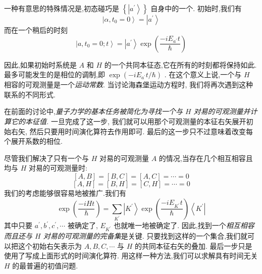 一种有意思的特殊情况是,初态碰巧是 $\left\{ \left| {a}^{\prime }\right\rangle \right\}$ 自身中的一个. 初始时,我们有
\begin{equation}
	\left| {\alpha ,{t}_{0} = 0}\right\rangle = \left| {a}^{\prime }\right\rangle
\end{equation}
而在一个稍后的时刻
\begin{equation}
	\left| {a,{t}_{0} = 0;t}\right\rangle = \left| {a}^{\prime }\right\rangle \exp \left( \frac{-i{E}_{{a}^{\prime }}t}{\hbar }\right)
\end{equation}

因此,如果初始时系统是 $A$ 和 $H$ 的一个共同本征态,它在所有的时刻都将保持如此. 最多可能发生的是相位的调制,即 $\exp \left( {-i{E}_{{a}^{\prime }}t/\hbar }\right)$ . 在这个意义上说,一个与 $H$ 相容的可观测量是一个\textit{运动常数}. 当讨论海森堡运动方程时, 我们将再次遇到这种联系的不同形式.

在前面的讨论中,\textit{量子力学的基本任务被简化为寻找一个与 $H$ 对易的可观测量并计算它的本征值.} 一旦完成了这一步, 我们就可以用那个可观测量的本征右矢展开初始右矢, 然后只要用时间演化算符去作用即可. 最后的这一步只不过意味着改变每个展开系数的相位.

尽管我们解决了只有一个与 $H$ 对易的可观测量 $A$ 的情况,当存在几个相互相容且均与 $H$ 对易的可观测量时:
\begin{equation}
	\left\lbrack {A, B}\right\rbrack = \left\lbrack {B, C}\right\rbrack = \left\lbrack {A, C}\right\rbrack = \cdots = 0
\end{equation}
\begin{equation}
	\left\lbrack {A, H}\right\rbrack = \left\lbrack {B, H}\right\rbrack = \left\lbrack {C, H}\right\rbrack = \cdots = 0
\end{equation}
我们的考虑能够很容易地被推广.我们有
\begin{equation}
	\exp \left( \frac{-{iHt}}{\hbar }\right) = \mathop{\sum }\limits_{{K}^{\prime }}\left| {K}^{\prime }\right\rangle \exp \left( \frac{-i{E}_{{K}^{\prime }}t}{\hbar }\right) \left\langle {K}^{\prime }\right|
\end{equation}
其中只要 ${a}^{\prime },{b}^{\prime },{c}^{\prime },\cdots$ 被确定了, ${E}_{{K}^{\prime }}$ 也就唯一地被确定了. 因此,找到一个\textit{相互相容而且还与 $H$ 对易的可观测量的完备集}是关键. 只要找到这样的一个集合,我们就可以把这个初始右矢表示为 $A, B, C,\cdots$ 与 $H$ 的共同本征右矢的叠加. 最后一步只是使用了写成上面形式的时间演化算符. 用这样一种方法,我们可以求解具有时间无关 $H$ 的最普遍的初值问题.
